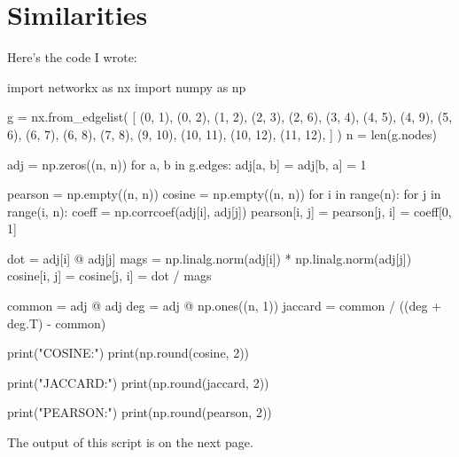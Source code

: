 \documentclass[12pt]{article}
\begin{document}
\section{Similarities}

Here's the code I wrote:
\begin{python}
import networkx as nx
import numpy as np

g = nx.from_edgelist(
    [
        (0, 1),
        (0, 2),
        (1, 2),
        (2, 3),
        (2, 6),
        (3, 4),
        (4, 5),
        (4, 9),
        (5, 6),
        (6, 7),
        (6, 8),
        (7, 8),
        (9, 10),
        (10, 11),
        (10, 12),
        (11, 12),
    ]
)
n = len(g.nodes)

adj = np.zeros((n, n))
for a, b in g.edges:
    adj[a, b] = adj[b, a] = 1

pearson = np.empty((n, n))
cosine = np.empty((n, n))
for i in range(n):
    for j in range(i, n):
        coeff = np.corrcoef(adj[i], adj[j])
        pearson[i, j] = pearson[j, i] = coeff[0, 1]

        dot = adj[i] @ adj[j]
        mags = np.linalg.norm(adj[i]) * np.linalg.norm(adj[j])
        cosine[i, j] = cosine[j, i] = dot / mags

common = adj @ adj
deg = adj @ np.ones((n, 1))
jaccard = common / ((deg + deg.T) - common)

print("COSINE:")
print(np.round(cosine, 2))

print("JACCARD:")
print(np.round(jaccard, 2))

print("PEARSON:")
print(np.round(pearson, 2))
\end{python}

The output of this script is on the next page.

\pagebreak
\end{document}
